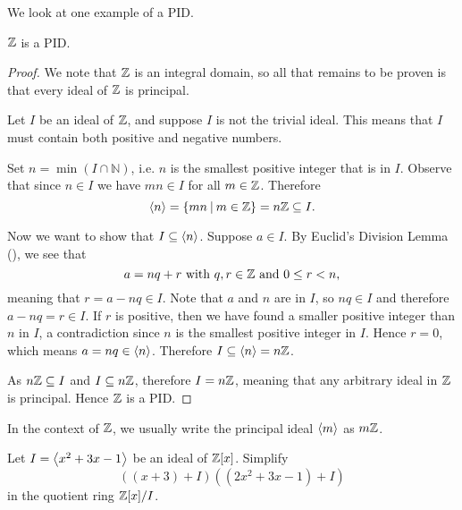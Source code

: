We look at one example of a PID.
\begin{proposition}
    $\mathbb{Z}$ is a PID.
\end{proposition}
\begin{proof}
    We note that $\mathbb{Z}$ is an integral domain, so all that remains to be proven is that every ideal of $\mathbb{Z}$ is principal.

    Let $I$ be an ideal of $\mathbb{Z}$, and suppose $I$ is not the trivial ideal. This means that $I$ must contain both positive and negative numbers.
    
    Set $n = \min(I \cap \mathbb{N})$, i.e. $n$ is the smallest positive integer that is in $I$. Observe that since $n \in I$ we have $mn \in I$ for all $m \in \mathbb{Z}$. Therefore
    \[
        \princ{n} = \{mn \vert m \in \Z\} = n\Z \subseteq I.
    \]

    Now we want to show that $I \subseteq \left\langle n\right\rangle$. Suppose $a \in I$. By Euclid's Division Lemma (), we see that
    \[
        a = nq + r \text{ with } q,r\in\mathbb{Z} \text{ and } 0 \leq r < n,
    \]
    meaning that $r = a - nq \in I$. Note that $a$ and $n$ are in $I$, so $nq \in I$ and therefore $a - nq = r \in I$. If $r$ is positive, then we have found a smaller positive integer than $n$ in $I$, a contradiction since $n$ is the smallest positive integer in $I$. Hence $r = 0$, which means $a = nq \in \left\langle n\right\rangle$. Therefore $I \subseteq \left\langle n\right\rangle = n\mathbb{Z}$.

    As $n\mathbb{Z} \subseteq I$ and $I \subseteq n\mathbb{Z}$, therefore $I = n\mathbb{Z}$, meaning that any arbitrary ideal in $\mathbb{Z}$ is principal. Hence $\mathbb{Z}$ is a PID.
\end{proof}
\begin{remark}
    In the context of $\mathbb{Z}$, we usually write the principal ideal $\left\langle m\right\rangle$ as $m\mathbb{Z}$.
\end{remark}
\begin{exercise}
    Let $I = \left\langle x^2 + 3x - 1\right\rangle$ be an ideal of $\mathbb{Z}[x]$. Simplify
    \[
        \left((x + 3) + I\right)\left((2x^2 + 3x - 1) + I\right)
    \]
    in the quotient ring $\mathbb{Z}[x]/I$.
\end{exercise}

\newpage

